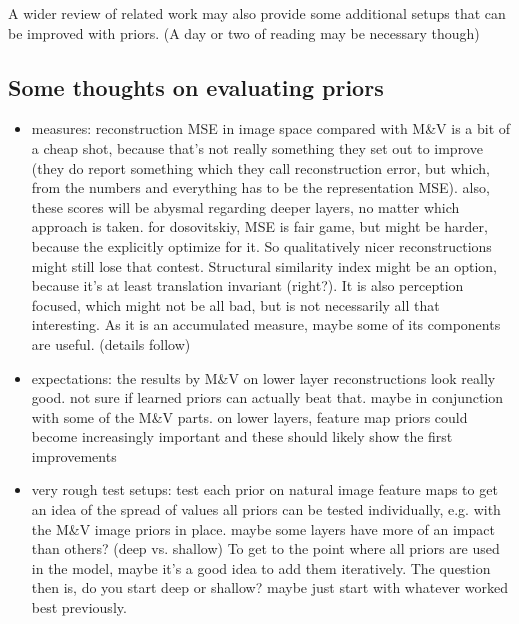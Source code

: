 \documentclass{article}
\begin{document}
A wider review of related work may also provide some additional setups that can be improved with priors. (A day or two of reading may be necessary though)

\subsection{Some thoughts on evaluating priors}

\begin{itemize}
	\item measures:
	\subitem reconstruction MSE in image space compared with M\&V is a bit of a cheap shot, because that's not really something they set out to improve (they do report something which they call reconstruction error, but which, from the numbers and everything has to be the representation MSE). also, these scores will be abysmal regarding deeper layers, no matter which approach is taken.
	\subitem for dosovitskiy, MSE is fair game, but might be harder, because the explicitly optimize for it. So qualitatively nicer reconstructions might still lose that contest.
	\subitem Structural similarity index might be an option, because it's at least translation invariant (right?). It is also perception focused, which might not be all bad, but is not necessarily all that interesting. As it is an accumulated measure, maybe some of its components are useful. (details follow)
	\item expectations:
	\subitem the results by M\&V on lower layer reconstructions look really good. not sure if learned priors can actually beat that. maybe in conjunction with some of the M\&V parts.
	\subitem on lower layers, feature map priors could become increasingly important and these should likely show the first improvements
	\item very rough test setups:
	\subitem test each prior on natural image feature maps to get an idea of the spread of values
	\subitem all priors can be tested individually, e.g. with the M\&V image priors in place. maybe some layers have more of an impact than others? (deep vs. shallow)
	\subitem To get to the point where all priors are used in the model, maybe it's a good idea to add them iteratively. The question then is, do you start deep or shallow? maybe just start with whatever worked best previously. 
\end{itemize}
\end{document}
